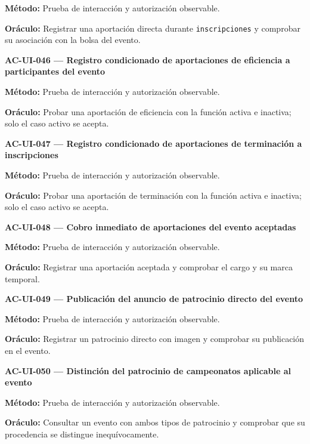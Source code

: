 \documentclass[10pt,letterpaper]{article}
\begin{document}
\textbf{Método:} Prueba de interacción y autorización observable.\par
\textbf{Oráculo:} Registrar una aportación directa durante \texttt{inscripciones} y comprobar su asociación con la bolsa del evento.\par\vspace{0.45em}
\noindent\textbf{AC-UI-046 --- Registro condicionado de aportaciones de eficiencia a participantes del evento}\par
\textbf{Método:} Prueba de interacción y autorización observable.\par
\textbf{Oráculo:} Probar una aportación de eficiencia con la función activa e inactiva; solo el caso activo se acepta.\par\vspace{0.45em}
\noindent\textbf{AC-UI-047 --- Registro condicionado de aportaciones de terminación a inscripciones}\par
\textbf{Método:} Prueba de interacción y autorización observable.\par
\textbf{Oráculo:} Probar una aportación de terminación con la función activa e inactiva; solo el caso activo se acepta.\par\vspace{0.45em}
\noindent\textbf{AC-UI-048 --- Cobro inmediato de aportaciones del evento aceptadas}\par
\textbf{Método:} Prueba de interacción y autorización observable.\par
\textbf{Oráculo:} Registrar una aportación aceptada y comprobar el cargo y su marca temporal.\par\vspace{0.45em}
\noindent\textbf{AC-UI-049 --- Publicación del anuncio de patrocinio directo del evento}\par
\textbf{Método:} Prueba de interacción y autorización observable.\par
\textbf{Oráculo:} Registrar un patrocinio directo con imagen y comprobar su publicación en el evento.\par\vspace{0.45em}
\noindent\textbf{AC-UI-050 --- Distinción del patrocinio de campeonatos aplicable al evento}\par
\textbf{Método:} Prueba de interacción y autorización observable.\par
\textbf{Oráculo:} Consultar un evento con ambos tipos de patrocinio y comprobar que su procedencia se distingue inequívocamente.\par\vspace{0.45em}
\end{document}
